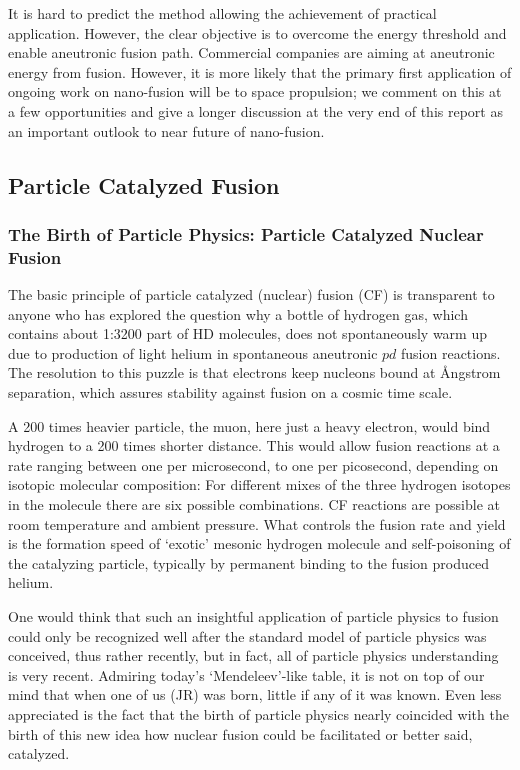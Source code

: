 \documentclass[particles,article,accept,pdftex,moreauthors]{Definitions/mdpi}
\begin{document}
It is hard to predict the method allowing the achievement of practical application. However, the clear objective is to overcome the energy threshold and enable aneutronic fusion path. Commercial companies are aiming at aneutronic energy from fusion. However, it is more likely that the primary first application of ongoing work on nano-fusion will be to space propulsion; we comment on this at a few opportunities and give a longer discussion at the very end of this report as an important outlook to near future of nano-fusion. 

\subsection{Particle Catalyzed Fusion}\label{ssec:INTmuCF}
\subsubsection{The Birth of Particle Physics: Particle Catalyzed Nuclear Fusion}\label{sssec:particles}

The basic principle of particle catalyzed (nuclear) fusion (CF) is transparent to anyone who has explored the question why a bottle of hydrogen gas, which contains about 1:3200 part of HD molecules, does not spontaneously warm up due to production of light helium in spontaneous aneutronic $pd$ fusion reactions. The resolution to this puzzle is that electrons keep nucleons bound at \AA ngstrom separation, which assures stability against fusion on a cosmic time scale.

A 200 times heavier particle, the muon, here just a heavy electron, would bind hydrogen to a 200 times shorter distance. This would allow fusion reactions at a rate ranging between one per microsecond, to one per picosecond, depending on isotopic molecular composition: For different mixes of the three hydrogen isotopes in the molecule there are six possible combinations. CF reactions are possible at room temperature and ambient pressure. What controls the fusion rate and yield is the formation speed of `exotic' mesonic hydrogen molecule and self-poisoning of the catalyzing particle, typically by permanent binding to the fusion produced helium. 

One would think that such an insightful application of particle physics to fusion could only be recognized well after the standard model of particle physics was conceived, thus rather recently, but in fact, all of particle physics understanding is very recent. Admiring today's `Mendeleev'-like table, it is not on top of our mind that when one of us (JR) was born, little if any of it was known. Even less appreciated is the fact that the birth of particle physics nearly coincided with the birth of this new idea how nuclear fusion could be facilitated or better said, catalyzed. 
\end{document}
